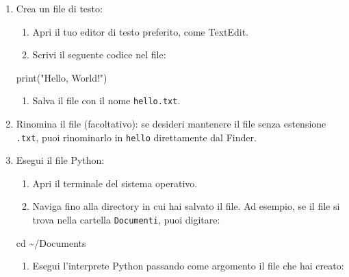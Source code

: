 \documentclass[
  letterpaper,
  DIV=11,
  numbers=noendperiod]{scrreprt}
\newenvironment{Shaded}{\begin{snugshade}}{\end{snugshade}}
\newcommand{\BuiltInTok}[1]{\textcolor[rgb]{0.00,0.23,0.31}{#1}}
\newcommand{\NormalTok}[1]{\textcolor[rgb]{0.00,0.23,0.31}{#1}}
\newcommand{\StringTok}[1]{\textcolor[rgb]{0.13,0.47,0.30}{#1}}
\providecommand{\tightlist}{%
  \setlength{\itemsep}{0pt}\setlength{\parskip}{0pt}}\usepackage{longtable,booktabs,array}
\begin{document}
\begin{enumerate}
\def\labelenumi{\arabic{enumi}.}
\item
  Crea un file di testo:

  \begin{enumerate}
  \def\labelenumii{\arabic{enumii}.}
  \tightlist
  \item
    Apri il tuo editor di testo preferito, come TextEdit.
  \item
    Scrivi il seguente codice nel file:
  \end{enumerate}

\begin{Shaded}
\begin{Highlighting}[]
\BuiltInTok{print}\NormalTok{(}\StringTok{"Hello, World!"}\NormalTok{)}
\end{Highlighting}
\end{Shaded}

  \begin{enumerate}
  \def\labelenumii{\arabic{enumii}.}
  \setcounter{enumii}{2}
  \tightlist
  \item
    Salva il file con il nome \texttt{hello.txt}.
  \end{enumerate}
\item
  Rinomina il file (facoltativo): se desideri mantenere il file senza
  estensione \texttt{.txt}, puoi rinominarlo in \texttt{hello}
  direttamente dal Finder.
\item
  Esegui il file Python:

  \begin{enumerate}
  \def\labelenumii{\arabic{enumii}.}
  \tightlist
  \item
    Apri il terminale del sistema operativo.
  \item
    Naviga fino alla directory in cui hai salvato il file. Ad esempio,
    se il file si trova nella cartella \texttt{Documenti}, puoi
    digitare:
  \end{enumerate}

\begin{Shaded}
\begin{Highlighting}[]
\BuiltInTok{cd}\NormalTok{ \textasciitilde{}/Documents}
\end{Highlighting}
\end{Shaded}

  \begin{enumerate}
  \def\labelenumii{\arabic{enumii}.}
  \setcounter{enumii}{2}
  \tightlist
  \item
    Esegui l'interprete Python passando come argomento il file che hai
    creato:
  \end{enumerate}


\end{enumerate}
\end{document}
